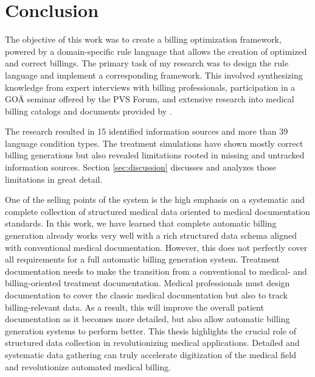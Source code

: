 \section{Conclusion}\label{sec:conclusion}
The objective of this work was to create a billing optimization framework, powered by a domain-specific rule language that allows the creation of optimized and correct billings.
The primary task of my research was to design the rule language and implement a corresponding framework.
This involved synthesizing knowledge from expert interviews with billing professionals,
participation in a GOÄ seminar offered by the PVS Forum, and extensive research into medical billing catalogs and documents provided by \AV.

The research resulted in 15 identified information sources and more than 39 language condition types.
The treatment simulations have shown mostly correct billing generations but also revealed limitations rooted in missing and untracked information sources.
Section \ref{sec:discussion} discusses and analyzes those limitations in great detail.

One of the selling points of the \AV system is the high emphasis on a systematic and complete collection of structured medical data oriented to medical documentation standards.
In this work, we have learned that complete automatic billing generation already works very well with a rich structured data schema aligned with conventional medical documentation.
However, this does not perfectly cover all requirements for a full automatic billing generation system.
Treatment documentation needs to make the transition from a conventional to medical- and billing-oriented treatment documentation.
Medical professionals must design documentation to cover the classic medical documentation but also to track billing-relevant data.
As a result, this will improve the overall patient documentation as it becomes more detailed, but also allow automatic billing generation systems to perform better.
This thesis highlights the crucial role of structured data collection in revolutionizing medical applications.
Detailed and systematic data gathering can truly accelerate digitization of the medical field and revolutionize automated medical billing.
